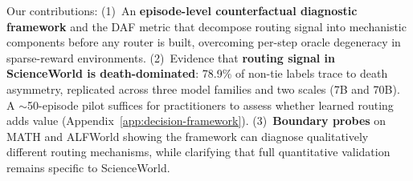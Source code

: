 Our contributions: (1)~An \textbf{episode-level counterfactual diagnostic framework} and the DAF metric that decompose routing signal into mechanistic components before any router is built, overcoming per-step oracle degeneracy in sparse-reward environments.
(2)~Evidence that \textbf{routing signal in ScienceWorld is death-dominated}: 78.9\% of non-tie labels trace to death asymmetry, replicated across three model families and two scales (7B and 70B). A ${\sim}$50-episode pilot suffices for practitioners to assess whether learned routing adds value (Appendix~\ref{app:decision-framework}).
(3)~\textbf{Boundary probes} on MATH and ALFWorld showing the framework can diagnose qualitatively different routing mechanisms, while clarifying that full quantitative validation remains specific to ScienceWorld.
